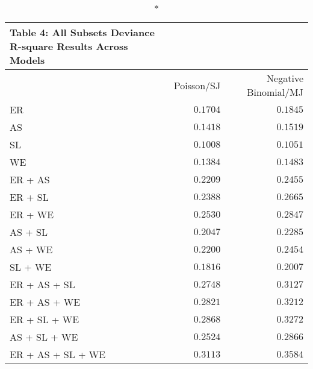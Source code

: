 \begin{longtable}{l|rr}
\caption*{
{\large Table 4: All Subsets Deviance R-square Results Across Models}
} \\ 
\toprule
\multicolumn{1}{l}{} & Poisson/SJ & Negative Binomial/MJ \\ 
\midrule
ER & $0.1704$ & $0.1845$ \\ 
AS & $0.1418$ & $0.1519$ \\ 
SL & $0.1008$ & $0.1051$ \\ 
WE & $0.1384$ & $0.1483$ \\ 
ER + AS & $0.2209$ & $0.2455$ \\ 
ER + SL & $0.2388$ & $0.2665$ \\ 
ER + WE & $0.2530$ & $0.2847$ \\ 
AS + SL & $0.2047$ & $0.2285$ \\ 
AS + WE & $0.2200$ & $0.2454$ \\ 
SL + WE & $0.1816$ & $0.2007$ \\ 
ER + AS + SL & $0.2748$ & $0.3127$ \\ 
ER + AS + WE & $0.2821$ & $0.3212$ \\ 
ER + SL + WE & $0.2868$ & $0.3272$ \\ 
AS + SL + WE & $0.2524$ & $0.2866$ \\ 
ER + AS + SL + WE & $0.3113$ & $0.3584$ \\ 
\bottomrule
\end{longtable}

